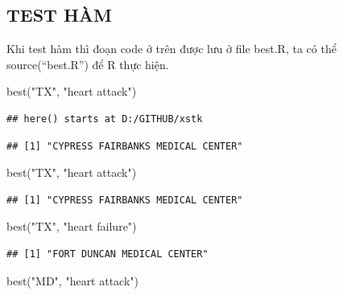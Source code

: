 \documentclass[
]{book}
\newenvironment{Shaded}{\begin{snugshade}}{\end{snugshade}}
\newcommand{\FunctionTok}[1]{\textcolor[rgb]{0.00,0.00,0.00}{#1}}
\newcommand{\NormalTok}[1]{#1}
\newcommand{\StringTok}[1]{\textcolor[rgb]{0.31,0.60,0.02}{#1}}
\theoremstyle{definition}
\theoremstyle{definition}
\theoremstyle{definition}
\theoremstyle{definition}
\theoremstyle{remark}
\begin{document}
\hypertarget{test-huxe0m}{%
\subsection{TEST HÀM}\label{test-huxe0m}}

Khi test hàm thì đoạn code ở trên được lưu ở file best.R, ta có thể source(``best.R'') để R thực hiện.

\begin{Shaded}
\begin{Highlighting}[]
\FunctionTok{best}\NormalTok{(}\StringTok{"TX"}\NormalTok{, }\StringTok{"heart attack"}\NormalTok{)}
\end{Highlighting}
\end{Shaded}

\begin{verbatim}
## here() starts at D:/GITHUB/xstk
\end{verbatim}

\begin{verbatim}
## [1] "CYPRESS FAIRBANKS MEDICAL CENTER"
\end{verbatim}

\begin{Shaded}
\begin{Highlighting}[]
\FunctionTok{best}\NormalTok{(}\StringTok{"TX"}\NormalTok{, }\StringTok{"heart attack"}\NormalTok{)}
\end{Highlighting}
\end{Shaded}

\begin{verbatim}
## [1] "CYPRESS FAIRBANKS MEDICAL CENTER"
\end{verbatim}

\begin{Shaded}
\begin{Highlighting}[]
\FunctionTok{best}\NormalTok{(}\StringTok{"TX"}\NormalTok{, }\StringTok{"heart failure"}\NormalTok{)}
\end{Highlighting}
\end{Shaded}

\begin{verbatim}
## [1] "FORT DUNCAN MEDICAL CENTER"
\end{verbatim}

\begin{Shaded}
\begin{Highlighting}[]
\FunctionTok{best}\NormalTok{(}\StringTok{"MD"}\NormalTok{, }\StringTok{"heart attack"}\NormalTok{)}
\end{Highlighting}
\end{Shaded}
\end{document}
